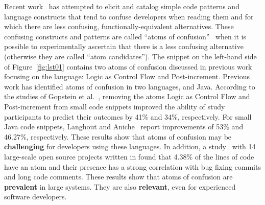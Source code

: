Recent work~\cite{DBLP:journals/ese/MedeirosLAAKRG19,DBLP:conf/sigsoft/GopsteinIYDZYC17,Langhout:2021:ACJ,TheEyesDoNotLie} has attempted to elicit and catalog simple code patterns and language constructs that tend to confuse developers when reading them and for which there are less confusing, functionally-equivalent alternatives. These confusing constructs and patterns are called ``atoms of confusion''~\cite{DBLP:conf/sigsoft/GopsteinIYDZYC17} when it is possible to experimentally ascertain that there is a less confusing alternative (otherwise they are called ``atom candidates''). The snippet on the left-hand side of Figure~\ref{fig:lst01} contains two atoms of confusion discussed in previous work~\cite{DBLP:conf/sigsoft/GopsteinIYDZYC17} focusing on the \clang language: Logic as Control Flow and Post-increment. Previous work has identified atoms of confusion in two languages, \clang and Java. According to the studies of Gopstein et al.~\cite{DBLP:conf/sigsoft/GopsteinIYDZYC17}, removing the atoms Logic as Control Flow and Post-increment from small \clang code snippets improved the ability of study participants to predict their outcomes by 41\% and 34\%, respectively. For small Java code snippets, Langhout and Aniche~\cite{Langhout:2021:ACJ} report improvements of 53\% and 46.27\%, respectively. These results show that atoms of confusion may be \textbf{challenging} for developers using these languages. In addition, a study~\cite{DBLP:conf/msr/GopsteinZFC18} with 14 large-scale open source projects written in \clang found that 4.38\% of the lines of code have an atom and their presence has a strong correlation with bug fixing commits and long code comments. These results show that atoms of confusion are \textbf{prevalent} in large systems. They are also \textbf{relevant}, even for experienced software developers. 


